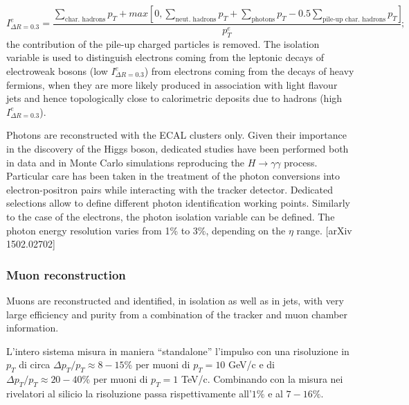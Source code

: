 \begin{equation}
I_{\Delta R = 0.3}^e = \frac{\sum_{\text{char. hadrons}} p_T + max\left[ 0, \sum_{\text{neut. hadrons}} p_T + \sum_{\text{photons}} p_T - 0.5 \sum_{\text{pile-up char. hadrons}} p_T\right]}{p_T^e};
\label{eq:electron_iso}
\end{equation}
the contribution of the pile-up charged particles is removed. The isolation variable is used to distinguish electrons coming from the leptonic decays of electroweak bosons (low $I_{\Delta R = 0.3}^e$) from electrons coming from the decays of heavy fermions, when they are more likely produced in association with light flavour jets and hence topologically close to calorimetric deposits due to hadrons (high $I_{\Delta R = 0.3}^e$).

\vspace*{1\baselineskip}

\noindent Photons are reconstructed with the ECAL clusters only. Given their importance in the discovery of the Higgs boson, dedicated studies have been performed both in data and in Monte Carlo simulations reproducing the $H \rightarrow \gamma \gamma$ process. Particular care has been taken in the treatment of the photon conversions into electron-positron pairs while interacting with the tracker detector. Dedicated selections allow to define different photon identification working points. Similarly to the case of the electrons, the photon isolation variable can be defined. The photon energy resolution varies from 1\% to 3\%, depending on the $\eta$ range. [arXiv 1502.02702]

\subsubsection{Muon reconstruction}
Muons are reconstructed and identified,
in isolation as well as in jets, with very large efficiency and purity from a combination of the
tracker and muon chamber information.

L'intero sistema misura in maniera ``standalone'' l'impulso con una risoluzione in $p_T$ di circa $\Delta p_T/p_T \approx 8-15\%$ per muoni di $p_T = 10$ GeV/c e di $\Delta p_T/p_T \approx 20-40\%$ per muoni di $p_T = 1$ TeV/c. Combinando con la misura nei rivelatori al silicio la risoluzione passa rispettivamente all'$1\%$ e al $7-16\%$.\\
